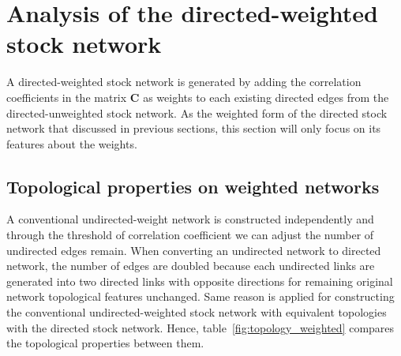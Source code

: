 \section{Analysis of the directed-weighted stock network}
A directed-weighted stock network is generated by adding the correlation coefficients in the matrix \textbf{C} as weights to each existing directed edges from the directed-unweighted stock network. As the weighted form of the directed stock network that discussed in previous sections, this section will only focus on its features about the weights.

\subsection{Topological properties on weighted networks}
A conventional undirected-weight network is constructed independently and through the threshold of correlation coefficient we can adjust the number of undirected edges remain. When converting an undirected network to directed network, the number of edges are doubled because each undirected links are generated into two directed links with opposite directions for remaining original network topological features unchanged. Same reason is applied for constructing the conventional undirected-weighted stock network with equivalent topologies with the directed stock network. Hence, table~\ref{fig:topology_weighted} compares the topological properties between them.

